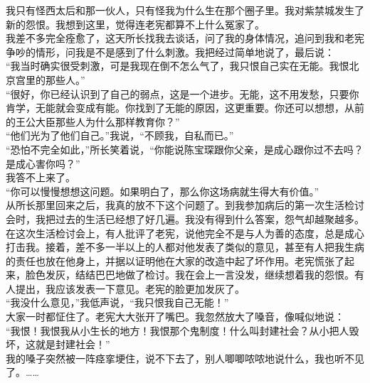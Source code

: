 我只有怪西太后和那一伙人，只有怪我为什么生在那个圈子里。我对紫禁城发生了新的怨恨。我想到这里，觉得连老宪都算不上什么冤家了。\\

我差不多完全痊愈了，这天所长找我去谈话，问了我的身体情况，追问到我和老宪争吵的情形，问我是不是感到了什么刺激。我把经过简单地说了，最后说：\\

“我当时确实很受刺激，可是我现在倒不怎么气了，我只恨自己实在无能。我恨北京宫里的那些人。”\\

“很好，你已经认识到了自己的弱点，这是一个进步。无能，这不用发愁，只要你肯学，无能就会变成有能。你找到了无能的原因，这更重要。你还可以想想，从前的王公大臣那些人为什么那样教育你？”\\

“他们光为了他们自己。”我说，“不顾我，自私而已。”\\

“恐怕不完全如此，”所长笑着说，“你能说陈宝琛跟你父亲，是成心跟你过不去吗？是成心害你吗？”\\

我答不上来了。\\

“你可以慢慢想想这问题。如果明白了，那么你这场病就生得大有价值。”\\

从所长那里回来之后，我真的放不下这个问题了。到我参加病后的第一次生活检讨会时，我把过去的生活已经想了好几遍。我没有得到什么答案，怨气却越聚越多。\\

在这次生活检讨会上，有人批评了老宪，说他完全不是与人为善的态度，总是成心打击我。接着，差不多一半以上的人都对他发表了类似的意见，甚至有人把我生病的责任也放在他身上，并据以证明他在大家的改造中起了坏作用。老宪慌张了起来，脸色发灰，结结巴巴地做了检讨。我在会上一言没发，继续想着我的怨恨。有人提出，我应该发表一下意见。老宪的脸更加发灰了。\\

“我没什么意见，”我低声说，“我只恨我自己无能！”\\

大家一时都怔住了。老宪大大张开了嘴巴。我忽然放大了嗓音，像喊似地说：\\

“我恨！我恨我从小生长的地方！我恨那个鬼制度！什么叫封建社会？从小把人毁坏，这就是封建社会！”\\

我的嗓子突然被一阵痉挛埂住，说不下去了，别人唧唧哝哝地说什么，我也听不见了。……\\